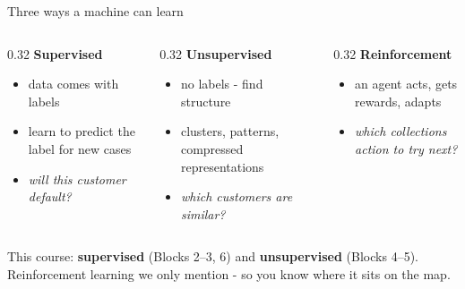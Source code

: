 \documentclass[10pt,aspectratio=169]{beamer}
\begin{document}
\begin{frame}{Three ways a machine can learn}
  \begin{columns}[T]
    \begin{column}{0.32\textwidth}
      \textbf{Supervised}
      \begin{itemize}\small
        \item data comes with \alert{labels}
        \item learn to predict the label for new cases
        \item \emph{will this customer default?}
      \end{itemize}
    \end{column}
    \begin{column}{0.32\textwidth}
      \textbf{Unsupervised}
      \begin{itemize}\small
        \item no labels - find \alert{structure}
        \item clusters, patterns, compressed representations
        \item \emph{which customers are similar?}
      \end{itemize}
    \end{column}
    \begin{column}{0.32\textwidth}
      \textbf{Reinforcement}
      \begin{itemize}\small
        \item an agent acts, gets \alert{rewards}, adapts
        \item \emph{which collections action to try next?}
      \end{itemize}
    \end{column}
  \end{columns}
  \vspace{0.8em}
  \begin{center}\small
    This course: \textbf{supervised} (Blocks 2--3, 6) and \textbf{unsupervised}
    (Blocks 4--5). Reinforcement learning we only mention - so you know
    where it sits on the map.
  \end{center}
\end{frame}
\end{document}
